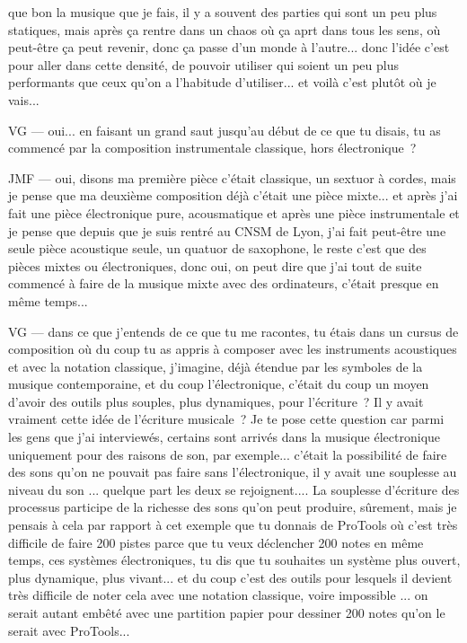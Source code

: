 que bon la musique que je fais, il y a souvent des parties qui sont un peu plus statiques, mais après ça rentre dans un chaos où ça aprt dans tous les sens, où peut-être ça peut revenir, donc ça passe d'un monde à l'autre... donc l'idée c'est pour aller dans cette densité, de pouvoir utiliser qui soient un peu plus performants que ceux qu'on a l'habitude d'utiliser... et voilà c'est plutôt où je vais... 

VG — oui... en faisant un grand saut jusqu'au début de ce que tu disais, tu as commencé par la composition instrumentale classique, hors électronique ? 

JMF — oui, disons ma première pièce c'était classique, un sextuor à cordes, mais je pense que ma deuxième composition déjà c'était une pièce mixte... et après j'ai fait une pièce électronique pure, acousmatique et après une pièce instrumentale et je pense que depuis que je suis rentré au CNSM de Lyon, j'ai fait peut-être une seule pièce acoustique seule, un quatuor de saxophone, le reste c'est que des pièces mixtes ou électroniques, donc oui, on peut dire que j'ai tout de suite commencé à faire de la musique mixte avec des ordinateurs, c'était presque en même temps... 

VG — dans ce que j'entends de ce que tu me racontes, tu étais dans un cursus de composition où du coup tu as appris à composer avec les instruments acoustiques et avec la notation classique, j'imagine, déjà étendue par les symboles de la musique contemporaine, et du coup l'électronique, c'était du coup un moyen d'avoir des outils plus souples, plus dynamiques, pour l'écriture ? Il y avait vraiment cette idée de l'écriture musicale ? Je te pose cette question car parmi les gens que j'ai interviewés, certains sont arrivés dans la musique électronique uniquement pour des raisons de son, par exemple... c'était la possibilité de faire des sons qu'on ne pouvait pas faire sans l'électronique, il y avait une souplesse au niveau du son ... quelque part les deux se rejoignent.... La souplesse d'écriture des processus participe de la richesse des sons qu'on peut produire, sûrement, mais je pensais à cela par rapport à cet exemple que tu donnais de ProTools où c'est très difficile de faire 200 pistes parce que tu veux déclencher 200 notes en même temps, ces systèmes électroniques, tu dis que tu souhaites un système plus ouvert, plus dynamique, plus vivant... et du coup c'est des outils pour lesquels il devient très difficile de noter cela avec une notation classique, voire impossible ... on serait autant embêté avec une partition papier pour dessiner 200 notes qu'on le serait avec ProTools...  

